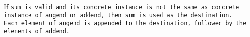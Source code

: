 If \tt{sum} is valid and its concrete instance is not the same as concrete
instance of \tt{augend} or \tt{addend}, then \tt{sum} is used as the destination.
Each element of \tt{augend} is appended to the destination,
followed by the elements of \tt{addend}.
